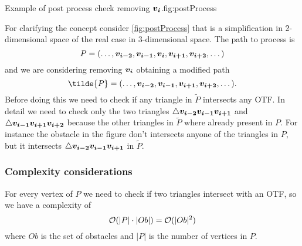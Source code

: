 \documentclass[dissertation.tex]{subfiles}
\begin{document}
\begin{myfig}{Example of post process check removing $\boldsymbol{v_i}$.}{fig:postProcess}
\end{myfig}
For clarifying the concept consider \cref{fig:postProcess} that is a
simplification in 2-dimensional space of the real case in
3-dimensional space. The path to process
is
\begin{equation*}
  P=(\dots,\boldsymbol{v_{i-2}},\boldsymbol{v_{i-1}},\boldsymbol{v_{i}},\boldsymbol{v_{i+1}},\boldsymbol{v_{i+2}},\dots)
\end{equation*}
and we are
considering removing $\boldsymbol{v_i}$ obtaining a modified path
\begin{equation*}
  \tilde{P}=(\dots,\ve{v_{i-2}},\ve{v_{i-1}},\ve{v_{i+1}},\ve{v_{i+2}},\dots).
\end{equation*}
Before doing this we need to check if any triangle in $\tilde{P}$
intersects any \ac{OTF}. In detail we need to check only the two
triangles $\triangle\boldsymbol{v_{i-2}}\boldsymbol{v_{i-1}}\boldsymbol{v_{i+1}}$ and
$\triangle\boldsymbol{v_{i-1}}\boldsymbol{v_{i+1}}\boldsymbol{v_{i+2}}$ because the other
triangles in $\tilde{P}$ where already present in $P$. For instance
the obstacle in the figure don't intersects anyone of the triangles in
$P$, but it intersects $\triangle\boldsymbol{v_{i-2}}\boldsymbol{v_{i-1}}\boldsymbol{v_{i+1}}$ in
$\tilde{P}$.

\subsubsection{Complexity considerations}
For every vertex of $P$ we need to check if two triangles intersect
with an \ac{OTF}, so we have a complexity of
\begin{equation*}
  \mathcal{O}(|P|\cdot|Ob|)=\mathcal{O}(|Ob|^2)
\end{equation*}
where $Ob$ is the set of obstacles and $|P|$ is the number of vertices
in $P$.
\end{document}
